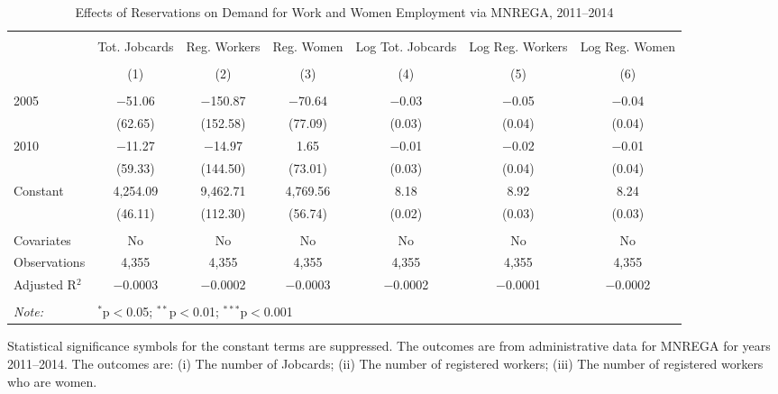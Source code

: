 \begin{sidewaystable}[!htbp]
\centering
\begin{threeparttable}

  \caption{Effects of Reservations on Demand for Work and Women Employment via MNREGA, 2011--2014} 
  \label{mnrega_main_raj_bose} 
\scriptsize 
\begin{tabular}{@{\extracolsep{0pt}}lcccccc} 
\\[-1.8ex]\hline 
\hline \\[-1.8ex] 
 & Tot. Jobcards & Reg. Workers & Reg. Women & Log Tot. Jobcards & Log Reg. Workers & Log Reg. Women \\ 
\\[-1.8ex] & (1) & (2) & (3) & (4) & (5) & (6)\\ 
\hline \\[-1.8ex] 
 2005 & $-$51.06 & $-$150.87 & $-$70.64 & $-$0.03 & $-$0.05 & $-$0.04 \\ 
  & (62.65) & (152.58) & (77.09) & (0.03) & (0.04) & (0.04) \\ 
  2010 & $-$11.27 & $-$14.97 & 1.65 & $-$0.01 & $-$0.02 & $-$0.01 \\ 
  & (59.33) & (144.50) & (73.01) & (0.03) & (0.04) & (0.04) \\ 
  Constant & 4,254.09 & 9,462.71 & 4,769.56 & 8.18 & 8.92 & 8.24 \\ 
  & (46.11) & (112.30) & (56.74) & (0.02) & (0.03) & (0.03) \\ 
 \hline \\[-1.8ex] 
Covariates & No & No & No & No & No & No \\ 
Observations & 4,355 & 4,355 & 4,355 & 4,355 & 4,355 & 4,355 \\ 
Adjusted R$^{2}$ & $-$0.0003 & $-$0.0002 & $-$0.0003 & $-$0.0002 & $-$0.0001 & $-$0.0002 \\ 
\hline 
\hline \\[-1.8ex] 
\textit{Note:}  & \multicolumn{6}{l}{$^{*}$p$<$0.05; $^{**}$p$<$0.01; $^{***}$p$<$0.001} \\ 
\end{tabular} 
\begin{tablenotes}[flushleft]
\setlength{\itemindent}{0em}
\scriptsize
\item Statistical significance symbols for the constant terms are suppressed. The outcomes are from administrative data for MNREGA for years 2011--2014. 
                           The outcomes are: 
                     (i) The number of Jobcards; 
                     (ii) The number of registered workers;
                     (iii) The number of registered workers who are women.
\end{tablenotes}
\end{threeparttable}
\end{sidewaystable}
